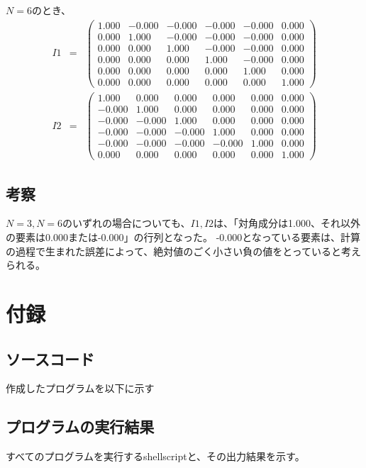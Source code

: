 \documentclass[11pt]{jsarticle}
\newcommand{\code}[2]{
	
}
\begin{document}
			$N=6$のとき、
			\begin{eqnarray*}
				I1 & = & \left( \begin{array}{cccccc}
					1.000 & -0.000 & -0.000 & -0.000 & -0.000 & 0.000\\
					0.000 & 1.000 & -0.000 & -0.000 & -0.000 & 0.000\\
					0.000 & 0.000 & 1.000 & -0.000 & -0.000 & 0.000\\
					0.000 & 0.000 & 0.000 & 1.000 & -0.000 & 0.000\\
					0.000 & 0.000 & 0.000 & 0.000 & 1.000 & 0.000\\
					0.000 & 0.000 & 0.000 & 0.000 & 0.000 & 1.000
				\end{array} \right)\\
				I2 & = & \left( \begin{array}{cccccc}
					1.000 & 0.000 & 0.000 & 0.000 & 0.000 & 0.000\\
					-0.000 & 1.000 & 0.000 & 0.000 & 0.000 & 0.000\\
					-0.000 & -0.000 & 1.000 & 0.000 & 0.000 & 0.000\\
					-0.000 & -0.000 & -0.000 & 1.000 & 0.000 & 0.000\\
					-0.000 & -0.000 & -0.000 & -0.000 & 1.000 & 0.000\\
					0.000 & 0.000 & 0.000 & 0.000 & 0.000 & 1.000
				\end{array} \right)
			\end{eqnarray*}
			
		\subsection{考察}
			$N=3,N=6$のいずれの場合についても、$I1,I2$は、「対角成分は1.000、それ以外の要素は0.000または-0.000」の行列となった。
			-0.000となっている要素は、計算の過程で生まれた誤差によって、絶対値のごく小さい負の値をとっていると考えられる。

	\newpage
	\section*{付録}
		\subsection*{ソースコード}
			作成したプログラムを以下に示す
			\code{共通}{print.go}
			\code{問１}{1.go}
			\code{問１}{forward.go}
			\code{問２}{2.go}
			\code{問２}{backward.go}
			\code{問４}{lu.go}
			\code{問４}{solve.go}
			\code{問５}{5.go}
			\code{問６}{"6\string_1.go"}
			\code{問６}{"6\string_2.go"}
			\code{問６}{6.go}
			\code{問８}{"8\string_1.go"}
			\code{問８}{"8\string_2.go"}
			\code{問８}{8.go}
			\code{問８}{inverse.go}
		\newpage

		\subsection*{プログラムの実行結果}
			すべてのプログラムを実行するshellscriptと、その出力結果を示す。
			
			
\end{document}
